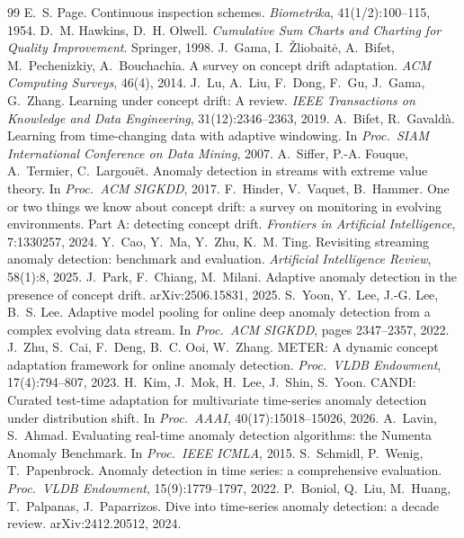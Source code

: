 \documentclass[11pt]{article}
\begin{document}
\begin{thebibliography}{99}
 E.~S. Page. Continuous inspection schemes. \emph{Biometrika}, 41(1/2):100--115, 1954.
 D.~M. Hawkins, D.~H. Olwell. \emph{Cumulative Sum Charts and Charting for Quality Improvement}. Springer, 1998.
 J.~Gama, I.~\v{Z}liobait\.{e}, A.~Bifet, M.~Pechenizkiy, A.~Bouchachia. A survey on concept drift adaptation. \emph{ACM Computing Surveys}, 46(4), 2014.
 J.~Lu, A.~Liu, F.~Dong, F.~Gu, J.~Gama, G.~Zhang. Learning under concept drift: A review. \emph{IEEE Transactions on Knowledge and Data Engineering}, 31(12):2346--2363, 2019.
 A.~Bifet, R.~Gavald\`a. Learning from time-changing data with adaptive windowing. In \emph{Proc.\ SIAM International Conference on Data Mining}, 2007.
 A.~Siffer, P.-A. Fouque, A.~Termier, C.~Largou\"et. Anomaly detection in streams with extreme value theory. In \emph{Proc.\ ACM SIGKDD}, 2017.
 F.~Hinder, V.~Vaquet, B.~Hammer. One or two things we know about concept drift: a survey on monitoring in evolving environments. Part A: detecting concept drift. \emph{Frontiers in Artificial Intelligence}, 7:1330257, 2024.
 Y.~Cao, Y.~Ma, Y.~Zhu, K.~M. Ting. Revisiting streaming anomaly detection: benchmark and evaluation. \emph{Artificial Intelligence Review}, 58(1):8, 2025.
 J.~Park, F.~Chiang, M.~Milani. Adaptive anomaly detection in the presence of concept drift. arXiv:2506.15831, 2025.
 S.~Yoon, Y.~Lee, J.-G. Lee, B.~S. Lee. Adaptive model pooling for online deep anomaly detection from a complex evolving data stream. In \emph{Proc.\ ACM SIGKDD}, pages 2347--2357, 2022.
 J.~Zhu, S.~Cai, F.~Deng, B.~C. Ooi, W.~Zhang. METER: A dynamic concept adaptation framework for online anomaly detection. \emph{Proc.\ VLDB Endowment}, 17(4):794--807, 2023.
 H.~Kim, J.~Mok, H.~Lee, J.~Shin, S.~Yoon. CANDI: Curated test-time adaptation for multivariate time-series anomaly detection under distribution shift. In \emph{Proc.\ AAAI}, 40(17):15018--15026, 2026.
 A.~Lavin, S.~Ahmad. Evaluating real-time anomaly detection algorithms: the Numenta Anomaly Benchmark. In \emph{Proc.\ IEEE ICMLA}, 2015.
 S.~Schmidl, P.~Wenig, T.~Papenbrock. Anomaly detection in time series: a comprehensive evaluation. \emph{Proc.\ VLDB Endowment}, 15(9):1779--1797, 2022.
 P.~Boniol, Q.~Liu, M.~Huang, T.~Palpanas, J.~Paparrizos. Dive into time-series anomaly detection: a decade review. arXiv:2412.20512, 2024.

\end{thebibliography}
\end{document}
